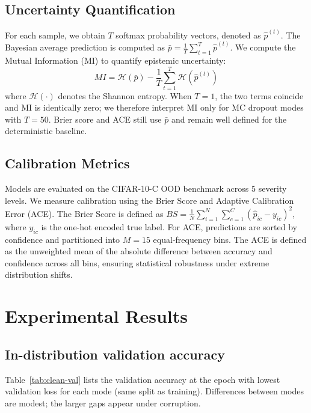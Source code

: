\documentclass[10pt,twocolumn,letterpaper]{article}
\begin{document}
\subsection{Uncertainty Quantification}
For each sample, we obtain $T$ softmax probability vectors, denoted as $\hat{p}^{(t)}$. The Bayesian average prediction is computed as $\bar{p} = \frac{1}{T}\sum_{t=1}^{T} \hat{p}^{(t)}$. We compute the Mutual Information (MI) to quantify epistemic uncertainty:
\begin{equation}
    MI = \mathcal{H}(\bar{p}) - \frac{1}{T}\sum_{t=1}^{T} \mathcal{H}(\hat{p}^{(t)})
\end{equation}
where $\mathcal{H}(\cdot)$ denotes the Shannon entropy. When $T{=}1$, the two terms coincide and MI is identically zero; we therefore interpret MI only for MC dropout modes with $T{=}50$. Brier score and ACE still use $\bar{p}$ and remain well defined for the deterministic baseline.

\subsection{Calibration Metrics}
Models are evaluated on the CIFAR-10-C OOD benchmark across 5 severity levels. We measure calibration using the Brier Score and Adaptive Calibration Error (ACE). The Brier Score is defined as $BS = \frac{1}{N} \sum_{i=1}^{N} \sum_{c=1}^{C} (\hat{p}_{ic} - y_{ic})^2$, where $y_{ic}$ is the one-hot encoded true label. For ACE, predictions are sorted by confidence and partitioned into $M=15$ equal-frequency bins. The ACE is defined as the unweighted mean of the absolute difference between accuracy and confidence across all bins, ensuring statistical robustness under extreme distribution shifts.

\section{Experimental Results}
\label{sec:exp}

\subsection{In-distribution validation accuracy}
Table~\ref{tab:clean-val} lists the validation accuracy at the epoch with lowest validation loss for each mode (same split as training). Differences between modes are modest; the larger gaps appear under corruption.

\begin{table}[t]
\centering
\caption{Best validation accuracy on clean CIFAR-10 (held-out fraction), at the epoch selected by minimum validation loss.}
\label{tab:clean-val}

\end{table}
\end{document}
